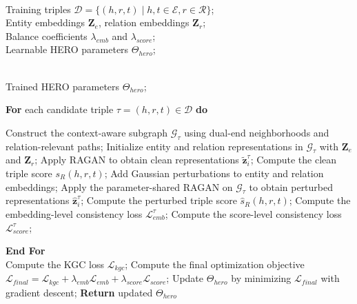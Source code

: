 \documentclass[a4paper,fleqn]{cas-sc}
\begin{document}
\begin{algorithm}[t]
\caption{Robust Reasoning and Optimization Procedure of HERO}
\label{alg:hero_reasoning}
\begin{algorithmic}[1]

\REQUIRE \ \\
Training triples $\mathcal{D}=\{(h,r,t)\mid h,t\in \mathcal{E}, r\in \mathcal{R}\}$;\\
Entity embeddings $\mathbf{Z}_{e}$, relation embeddings $\mathbf{Z}_{r}$;\\
Balance coefficients $\lambda_{emb}$ and $\lambda_{score}$;\\
Learnable HERO parameters $\Theta_{hero}$;

\ENSURE \ \\
Trained HERO parameters $\Theta_{hero}$;

\STATE \textbf{For} {each candidate triple $\tau=(h,r,t)\in\mathcal{D}$} \textbf{do}

    \STATE \hspace{0.5cm} Construct the context-aware subgraph $\mathcal{G}_{\tau}$ using dual-end neighborhoods and relation-relevant paths;
    \STATE \hspace{0.5cm} Initialize entity and relation representations in $\mathcal{G}_{\tau}$ with $\mathbf{Z}_{e}$ and $\mathbf{Z}_{r}$;
    \STATE \hspace{0.5cm} Apply RAGAN to obtain clean representations $\widetilde{\mathbf{z}}_{i}^{\tau}$;
    \STATE \hspace{0.5cm} Compute the clean triple score $s_R(h,r,t)$;
    \STATE \hspace{0.5cm} Add Gaussian perturbations to entity and relation embeddings;
    \STATE \hspace{0.5cm} Apply the parameter-shared RAGAN on $\mathcal{G}_{\tau}$ to obtain perturbed representations $\widehat{\mathbf{z}}_{i}^{\tau}$;
    \STATE \hspace{0.5cm} Compute the perturbed triple score $\widehat{s}_R(h,r,t)$;
    \STATE \hspace{0.5cm} Compute the embedding-level consistency loss $\mathcal{L}_{emb}^{\tau}$;
    \STATE \hspace{0.5cm} Compute the score-level consistency loss $\mathcal{L}_{score}^{\tau}$;

\STATE \textbf{End For} \\

\STATE Compute the KGC loss $\mathcal{L}_{kgc}$;
\STATE Compute the final optimization objective 
$\mathcal{L}_{final}=\mathcal{L}_{kgc}+\lambda_{emb}\mathcal{L}_{emb}+\lambda_{score}\mathcal{L}_{score}$;
\STATE Update $\Theta_{hero}$ by minimizing $\mathcal{L}_{final}$ with gradient descent;
\STATE \textbf{Return} updated $\Theta_{hero}$

\end{algorithmic}
\end{algorithm}
\end{document}
